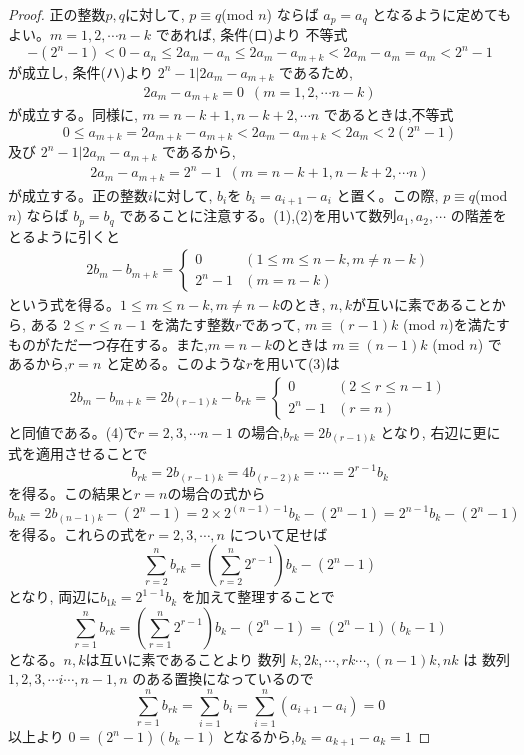 \begin{proof}
正の整数$p,q$に対して, $p\equiv q $(mod $n$) ならば $a_p=a_q$ となるように定めてもよい。$m=1,2,\cdots n-k$ であれば, 条件(ロ)より 不等式
\[
-(2^n-1)<0-a_n\le 2a_m-a_n\le 2a_m-a_{m+k}<2a_m-a_m=a_m<2^n-1
\]
が成立し, 条件(ハ)より $2^n-1|2a_m-a_{m+k}$ であるため,
\begin{eqnarray}
2a_m-a_{m+k}=0 \,\,\,(m=1,2,\cdots n-k)
\end{eqnarray}
が成立する。同様に, $m=n-k+1, n-k+2, \cdots n$ であるときは,不等式
\[
0\le a_{m+k}=2a_{m+k}-a_{m+k}< 2a_m-a_{m+k}<2a_m<2(2^n-1)
\]
及び $2^n-1|2a_m-a_{m+k}$ であるから,
\begin{eqnarray}
2a_m-a_{m+k}=2^n-1\,\,\, (m=n-k+1,n-k+2,\cdots n)
\end{eqnarray}
が成立する。正の整数$i$に対して, $b_i$を $b_i=a_{i+1}-a_i$ と置く。この際, $p\equiv q $(mod $n$) ならば $b_p=b_q$ であることに注意する。(1),(2)を用いて数列$a_1,a_2,\cdots$ の階差をとるように引くと
\begin{eqnarray}
2b_{m}-b_{m+k}=
\begin{cases}
0 & (1\le m\le n-k, m\neq n-k)\\
2^n-1 & (m=n-k)
\end{cases}
\end{eqnarray}
という式を得る。$1\le m\le n-k, m\neq n-k$のとき, $n,k$が互いに素であることから, ある $2\le r\le n-1$ を満たす整数$r$であって, $m\equiv (r-1)k$ (mod $n$)を満たすものがただ一つ存在する。また,$m=n-k$のときは $m\equiv (n-1)k$ (mod $n$) であるから,$r=n$ と定める。このような$r$を用いて(3)は
\begin{eqnarray}
2b_{m}-b_{m+k}=2b_{(r-1)k}-b_{rk}=
\begin{cases}
0 & (2\le r\le n-1)\\
2^n-1 & (r=n)
\end{cases}
\end{eqnarray}
と同値である。(4)で$r=2,3,\cdots n-1$ の場合,$b_{rk}=2b_{(r-1)k}$ となり, 右辺に更に式を適用させることで
\[b_{rk}=2b_{(r-1)k}=4b_{(r-2)k}=\cdots =2^{r-1}b_k\]
を得る。この結果と$r=n$の場合の式から
\[b_{nk}=2b_{(n-1)k}-(2^n-1) = 2\times2^{(n-1)-1}b_k -(2^n-1)=2^{n-1}b_k-(2^n-1)\]
を得る。これらの式を$r=2,3,\cdots, n$ について足せば
\[\displaystyle\sum_{r=2}^nb_{rk}=\left(\displaystyle\sum_{r=2}^n2^{r-1}\right)b_k -(2^n-1)\]
となり, 両辺に$b_{1k}=2^{1-1}b_k$ を加えて整理することで
\[\displaystyle\sum_{r=1}^nb_{rk}=\left(\displaystyle\sum_{r=1}^n2^{r-1}\right)b_k -(2^n-1)=(2^n-1)(b_k-1)\]
となる。$n,k$は互いに素であることより 数列 $k,2k,\cdots,rk\cdots,(n-1)k,nk$ は 数列 $1,2,3,\cdots i \cdots,n-1,n$ のある置換になっているので
\[\displaystyle\sum_{r=1}^nb_{rk}=\displaystyle\sum_{i=1}^nb_{i}=\displaystyle\sum_{i=1}^n(a_{i+1}-a_i)=0\]
以上より $0=(2^n-1)(b_k-1)$ となるから,$b_k=a_{k+1}-a_k=1$ 
\end{proof}
